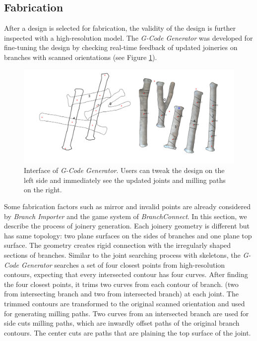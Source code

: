 \subsection{Fabrication}
After a design is selected for fabrication, the validity of the design is further inspected with a high-resolution model.
The \textit{G-Code Generator} was developed for fine-tuning the design by checking real-time feedback of updated joineries on branches with scanned orientations (see Figure \ref{fig:gcode_gen}).

\begin{figure}[ht]
  \begin{center}
    \includegraphics[width = 0.4\paperwidth]{images/system/joint_generator_2.png}
    \caption{Interface of \textit{G-Code Generator}. Users can tweak the design on the left side and immediately see the updated joints and milling paths on the right. }
    \label{fig:gcode_gen}
  \end{center}
\end{figure}

Some fabrication factors such as mirror and invalid points are already considered by \textit{Branch Importer} and the game system of \textit{BranchConnect}.
In this section, we describe the process of joinery generation.
Each joinery geometry is different but has same topology: two plane surfaces on the sides of branches and one plane top surface.
The geometry creates rigid connection with the irregularly shaped sections of branches.
Similar to the joint searching process with skeletons, the \textit{G-Code Generator} searches a set of four closest points from high-resolution contours, expecting that every intersected contour has four curves.
After finding the four closest points, it trims two curves from each contour of branch. (two from intersecting branch and two from intersected branch) at each joint.
The trimmed contours are transformed to the original scanned orientation and used for generating milling paths.
Two curves from an intersected branch are used for side cuts milling paths, which are inwardly offset paths of the original branch contours. 
The center cuts are paths that are plaining the top surface of the joint.

